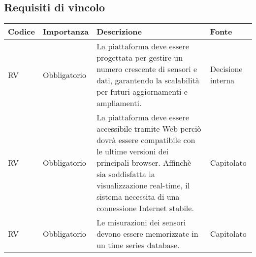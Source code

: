 \subsection{Requisiti di vincolo}
\setcounter{rowcounter}{0}
\begin{longtable}{|C{1cm}|C{2cm}|>{\raggedright}m{5cm}|C{2cm}|}
    \hline
    \textbf{Codice}                                & \textbf{Importanza} & \textbf{Descrizione}                                                                                                                                                                               & \textbf{Fonte}  \\
    \hline
    RV                          & Obbligatorio        & La piattaforma deve essere progettata per gestire un numero crescente di sensori e dati, garantendo la scalabilità per futuri aggiornamenti e ampliamenti.                                         & Decisione
    interna \\
    \hline
     RV & Obbligatorio        & La piattaforma deve essere accessibile tramite Web perciò dovrà essere compatibile con le ultime versioni dei principali browser. Affinchè
    sia soddisfatta la visualizzazione real-time, il sistema necessita di una
    connessione Internet stabile.                  & Capitolato           \\   
    \hline
     RV & Obbligatorio        & Le misurazioni dei sensori devono essere memorizzate in un
    time series database.                 & Capitolato           \\   
    \hline
\end{longtable}




